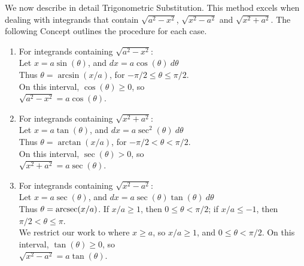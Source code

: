 We now describe in detail Trigonometric Substitution. This \newline method excels when dealing with integrands that contain \newline $\sqrt{a^2-x^2}$, $\sqrt{x^2-a^2}$ and $\sqrt{x^2+a^2}$. The following Concept outlines the procedure for each case.

{\begin{enumerate}[1)]
\item For integrands containing $\sqrt{a^2-x^2}$: \label{C.5.3-sin}\\[5pt]
	Let $x=a\sin(\theta)$, and $dx = a\cos(\theta)\ d\theta$\\[5pt]	
	Thus $\theta = \arcsin(x/a)$, for $-\pi/2\leq \theta\leq \pi/2$. \\[5pt]	
	On this interval, $\cos(\theta)\geq 0$, so\\[5pt]	
	$\sqrt{a^2-x^2} = a\cos(\theta)$.
		
\item For integrands containing $\sqrt{x^2+a^2}$: \label{C.5.3-tan} \\[5pt]
	Let $x=a\tan(\theta)$, and $dx = a\sec^2(\theta)\ d\theta$\\[5pt]	
	Thus $\theta = \arctan(x/a)$, for $-\pi/2 < \theta < \pi/2$. \\[5pt]	
	On this interval, $\sec(\theta)> 0$, so\\[5pt]	
	$\sqrt{x^2+a^2} = a\sec(\theta)$.
		
\item For integrands containing $\sqrt{x^2-a^2}$: \label{C.5.3-sec} \\[5pt]
	Let $x=a\sec(\theta)$, and $dx = a\sec(\theta)\tan(\theta)\ d\theta$\\[5pt]	
	Thus $\theta = \operatorname{arcsec}(x/a)$. If $x/a\geq 1$, then $0\leq\theta<\pi/2$; if $x/a \leq -1$, then $\pi/2<\theta\leq \pi$.\\[5pt]	
	We restrict our work to where $x\geq a$, so $x/a\geq 1$, and $0\leq\theta<\pi/2$.
	On this interval, $\tan(\theta)\geq 0$, so\\[5pt]	
	$\sqrt{x^2-a^2} = a\tan(\theta)$.
\end{enumerate}
} %

